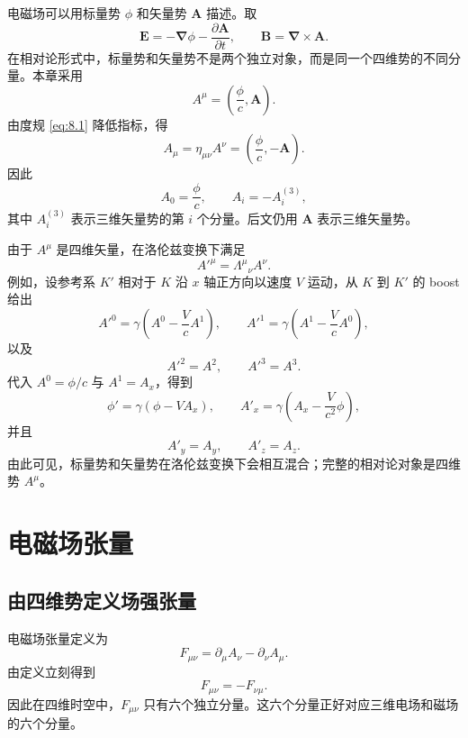 电磁场可以用标量势 $\phi$ 和矢量势 $\bm{A}$ 描述。取
\begin{equation}
	\bm{E}
	=
	-\bm{\nabla}\phi
	-
	\frac{\partial\bm{A}}{\partial t},
	\qquad
	\bm{B}
	=
	\bm{\nabla}\times\bm{A}.
	\label{eq:8.8}
\end{equation}
在相对论形式中，标量势和矢量势不是两个独立对象，而是同一个四维势的不同分量。本章采用
\begin{equation}
	A^{\mu}
	=
	\left(
	\frac{\phi}{c},
	\bm{A}
	\right).
	\label{eq:8.9}
\end{equation}
由度规 \eqref{eq:8.1} 降低指标，得
\begin{equation}
	A_{\mu}
	=
	\eta_{\mu\nu}A^{\nu}
	=
	\left(
	\frac{\phi}{c},
	-\bm{A}
	\right).
	\label{eq:8.10}
\end{equation}
因此
\[
A_{0}=\frac{\phi}{c},
\qquad
A_{i}=-A^{(3)}_{i},
\]
其中 $A^{(3)}_{i}$ 表示三维矢量势的第 $i$ 个分量。后文仍用 $\bm{A}$ 表示三维矢量势。

由于 $A^{\mu}$ 是四维矢量，在洛伦兹变换下满足
\begin{equation}
	A'^{\mu}=\Lambda^{\mu}{}_{\nu}A^{\nu}.
	\label{eq:8.12}
\end{equation}
例如，设参考系 $K'$ 相对于 $K$ 沿 $x$ 轴正方向以速度 $V$ 运动，从 $K$ 到 $K'$ 的 boost 给出
\[
A'^{0}=\gamma\left(A^{0}-\frac{V}{c}A^{1}\right),
\qquad
A'^{1}=\gamma\left(A^{1}-\frac{V}{c}A^{0}\right),
\]
以及
\[
A'^{2}=A^{2},
\qquad
A'^{3}=A^{3}.
\]
代入 $A^{0}=\phi/c$ 与 $A^{1}=A_{x}$，得到
\[
\phi'
=
\gamma(\phi-VA_{x}),
\qquad
A'_{x}
=
\gamma\left(A_{x}-\frac{V}{c^{2}}\phi\right),
\]
并且
\[
A'_{y}=A_{y},
\qquad
A'_{z}=A_{z}.
\]
由此可见，标量势和矢量势在洛伦兹变换下会相互混合；完整的相对论对象是四维势 $A^{\mu}$。

\section{电磁场张量}

\subsection{由四维势定义场强张量}

电磁场张量定义为
\begin{equation}
	F_{\mu\nu}
	=
	\partial_{\mu}A_{\nu}-\partial_{\nu}A_{\mu}.
	\label{eq:8.17}
\end{equation}
由定义立刻得到
\begin{equation}
	F_{\mu\nu}=-F_{\nu\mu}.
	\label{eq:8.18}
\end{equation}
因此在四维时空中，$F_{\mu\nu}$ 只有六个独立分量。这六个分量正好对应三维电场和磁场的六个分量。


